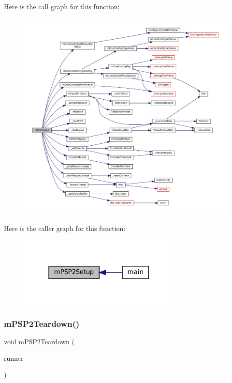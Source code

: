 Here is the call graph for this function\+:
\nopagebreak
\begin{figure}[H]
\begin{center}
\leavevmode
\includegraphics[width=350pt]{psp2-context_8h_a421c14012a9792c249822f943155921a_cgraph}
\end{center}
\end{figure}
Here is the caller graph for this function\+:
\nopagebreak
\begin{figure}[H]
\begin{center}
\leavevmode
\includegraphics[width=235pt]{psp2-context_8h_a421c14012a9792c249822f943155921a_icgraph}
\end{center}
\end{figure}
\mbox{\label{psp2-context_8h_aaae5f4b3a42c091f809836cec74d1cd7}} 
\subsubsection{\texorpdfstring{m\+P\+S\+P2\+Teardown()}{mPSP2Teardown()}}
{\footnotesize\ttfamily void m\+P\+S\+P2\+Teardown (\begin{DoxyParamCaption}\item[{struct \mbox{\hyperlink{structm_g_u_i_runner}{m\+G\+U\+I\+Runner}} $\ast$}]{runner }\end{DoxyParamCaption})}

